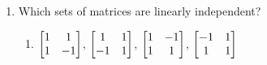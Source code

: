 \begin{enumerate}
	
\begin{enumerate}
	\item Which sets of matrices are linearly independent?
		\begin{enumerate}
			\item $\begin{bmatrix} 1&1\\1&-1 \end{bmatrix}$, $\begin{bmatrix} 1&1\\-1&1 \end{bmatrix}$, $\begin{bmatrix} 1&-1\\1&1 \end{bmatrix}$, $\begin{bmatrix} -1&1\\1&1 \end{bmatrix}$
		\end{enumerate}

\end{enumerate}
	
\end{enumerate}


